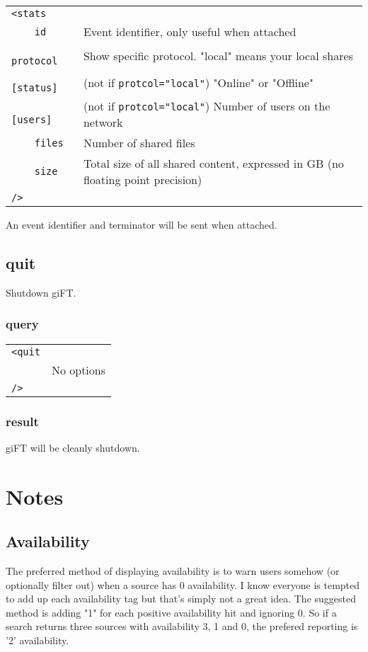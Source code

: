 \documentclass[10pt]{article}
\begin{document}
\begin{tabular}{p{2.6cm}p{8.5cm}}
\verb|<stats|   & \\
\verb|    id|   & Event identifier, only useful when attached \\
\verb|    protocol| & Show specific protocol. "local" means your local shares \\
\verb|    [status]| & (not if \verb|protcol="local"|) "Online" or "Offline" \\
\verb|    [users]|  & (not if \verb|protcol="local"|) Number of users on the network \\
\verb|    files|    & Number of shared files \\
\verb|    size|     & Total size of all shared content, expressed in GB (no floating point precision) \\
\verb|/>|       &
\end{tabular}

An event identifier and terminator will be sent when attached.

\subsection{quit}
Shutdown giFT.

\subsubsection{query}
\begin{tabular}{p{2.6cm}p{8.5cm}}
\verb|<quit|   & \\
\verb|     |    & No options \\
\verb|/>|       &
\end{tabular}

\subsubsection{result}
giFT will be cleanly shutdown.

\section{Notes}

\subsection{Availability}
The preferred method of displaying availability is to warn users somehow (or
optionally filter out) when a source has 0 availability.  I know everyone is
tempted to add up each availability tag but that's simply not a great idea. The
suggested method is adding "1" for each positive availability hit and ignoring
0. So if a search returns three sources with availability 3, 1 and 0, the
prefered reporting is '2' availability.
\end{document}
